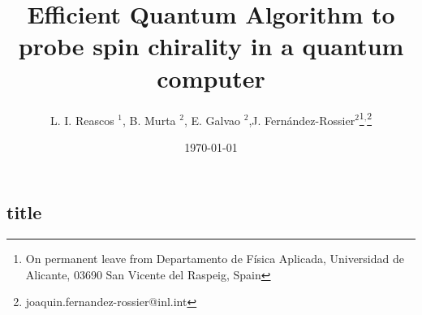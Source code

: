 \documentclass[aps,prb,onecolumn]{revtex4}
\begin{document}
\title{Efficient Quantum Algorithm to probe spin chirality in a quantum computer}

\author{L. I. Reascos $^{1}$, B. Murta $^{2}$, E. Galvao $^2$,J. Fern\'{a}ndez-Rossier$^2$\footnote{On permanent leave from Departamento de F\'{i}sica Aplicada, Universidad de Alicante, 03690 San Vicente del Raspeig, Spain}$^,$\footnote{joaquin.fernandez-rossier@inl.int} }



\date{\today}

\begin{appendix}
\maketitle


\section{title}


\end{appendix}


\end{document}
